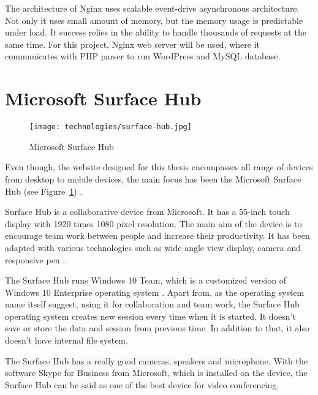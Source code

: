 The architecture of Nginx uses scalable event-drive asynchronous architecture. Not only it uses small amount of memory, but the memory usage is predictable under load. It success relies in the ability to handle thousands of requests at the same time. For this project, Nginx web server will be used, where it communicates with PHP parser to run WordPress and MySQL database.

\section{Microsoft Surface Hub}
\begin{figure}[ht]
\caption{Microsoft Surface Hub}
\label{fig:surface-hub}
\centering
\texttt{[image: technologies/surface-hub.jpg]}
\end{figure}

Even though, the website designed for this thesis encompasses all range of devices from desktop to mobile devices, the main focus has been the Microsoft Surface Hub (see Figure~\ref{fig:surface-hub}) \cite{MarkHachman.2016}\cite{MicrosoftCrop..2016}.

Surface Hub is a collaborative device from Microsoft. It has a 55-inch touch display with 1920 times 1080 pixel resolution. The main aim of the device is to encourage team work between people and increase their productivity. It has been adapted with various technologies such as wide angle view display, camera and responsive pen \cite{Microsoft.2016}.

The Surface Hub runs Windows 10 Team, which is a customized version of Windows 10 Enterprise operating system \cite{MarkHachman.2016b}. Apart from, as the operating system name itself suggest, using it for collaboration and team work, the Surface Hub operating system creates new session every time when it is started. It doesn't save or store the data and session from previous time. In addition to that, it also doesn't have internal file system.

The Surface Hub has a really good cameras, speakers and microphone. With the software Skype for Business from Microsoft,  which is installed on the device, the Surface Hub can be said as one of the best device for video conferencing. 

